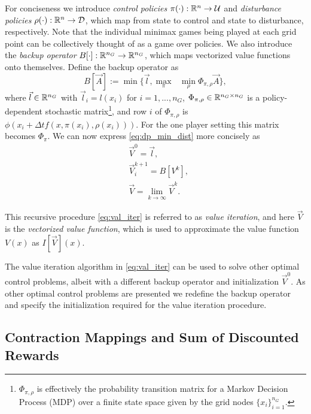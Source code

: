 For conciseness we introduce \emph{control policies} ${\pi(\cdot): \mathbb{R}^n \rightarrow \mathcal{U}}$ and \emph{disturbance policies} ${\rho(\cdot): \mathbb{R}^n \rightarrow \mathcal{D}}$, which map from state to control and state to disturbance, respectively. Note that the individual minimax games being played at each grid point can be collectively thought of as a game over policies. We also introduce the \emph{backup operator} ${B[\cdot]: \mathbb{R}^{n_G} \rightarrow \mathbb{R}^{n_G}}$, which maps vectorized value functions onto themselves. Define the backup operator as
%
\begin{equation} \label{eq: op_min_dist}
 B[\vec{A}] := \min\{\vec{l},  \underset{\pi}{\max}\text{ }\underset{ \rho}{\min} \Phi_{\pi, \rho} \vec{A}\},
\end{equation}%
\noindent where ${\vec{l} \in \mathbb{R}^{n_G}}$ with ${\vec{l}_i = l(x_i)}$ for ${i=1, ..., n_G}$, ${\Phi_{\pi, \rho} \in \mathbb{R}^{n_G \times n_G}}$ is a policy-dependent stochastic matrix\footnote{$\Phi_{\pi, \rho}$ is effectively the probability transition matrix for a Markov Decision Process (MDP) over a finite state space given by the grid nodes ${\{x_i\}_{i=1}^{n_G}}$.}, and row $i$ of $\Phi_{\pi, \rho}$ is $\phi(x_i+\Delta tf(x, \pi(x_i), \rho(x_i)))$. For the one player setting this matrix becomes $\Phi_{\pi}$. We can now express \eqref{eq:dp_min_dist} more concisely as
%
\begin{subequations}\label{eq:val_iter}
\begin{align}
&\vec{V}^{0} = \vec{l},\\
&\vec{V}_{i}^{k+1} = B[V^k],\\
&\vec{V} = \lim_{k\rightarrow \infty} \vec{V}^{k}.
\end{align}
\end{subequations}

This recursive procedure \eqref{eq:val_iter} is referred to as \emph{value iteration}, and here $\vec{V}$ is the \emph{vectorized value function}, which is used to approximate the value function $V(x)$ as $I[\vec{V}](x)$. 

The value iteration algorithm in \eqref{eq:val_iter} can be used to solve other optimal control problems, albeit with a different backup operator and initialization $\vec{V}^{0}$. As other optimal control problems are presented we redefine the backup operator and specify the initialization required for the value iteration procedure.

\subsection{Contraction Mappings and Sum of Discounted Rewards}

